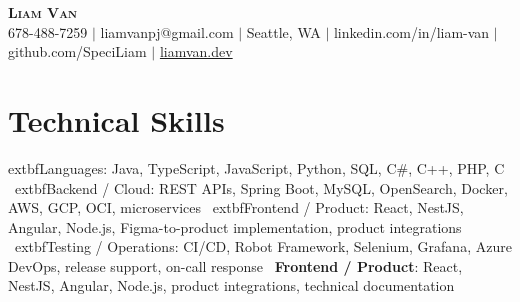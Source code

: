 \documentclass[letterpaper,11pt]{article}
\begin{document}

%
\begin{center}
    \textbf{\Huge \scshape Liam Van} \\ \vspace{1pt}
    \small 678-488-7259 $|$ \small {liamvanpj@gmail.com} $|$ Seattle, WA
 {{$|$ linkedin.com/in/liam-van} {$|$ github.com/SpeciLiam} {$|$ \href{https://liamvan.dev}{liamvan.dev}}}

\end{center}

\section{Technical Skills}
 \begin{itemize}[leftmargin=0.15in, label={}]
    \small{\item{
     	extbf{Languages}{: Java, TypeScript, JavaScript, Python, SQL, C\#, C++, PHP, C} \
     	extbf{Backend / Cloud}{: REST APIs, Spring Boot, MySQL, OpenSearch, Docker, AWS, GCP, OCI, microservices} \
     	extbf{Frontend / Product}{: React, NestJS, Angular, Node.js, Figma-to-product implementation, product integrations} \
     	extbf{Testing / Operations}{: CI/CD, Robot Framework, Selenium, Grafana, Azure DevOps, release support, on-call response} \
     \textbf{Frontend / Product}{: React, NestJS, Angular, Node.js, product integrations, technical documentation} \\
    }}
 \end{itemize}
%

\end{document}
